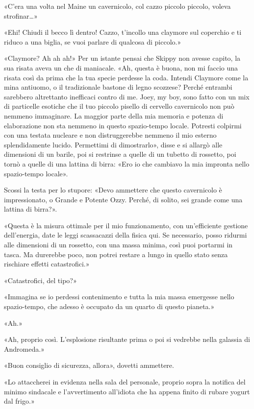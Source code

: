 «C'era una volta nel Maine un cavernicolo, col cazzo piccolo piccolo,
voleva strofinar\ldots»

«Ehi! Chiudi il becco lì dentro! Cazzo, t'incollo una claymore sul
coperchio e ti riduco a una biglia, se vuoi parlare di qualcosa di
piccolo.»

«Claymore? Ah ah ah!» Per un istante pensai che Skippy non avesse
capito, la sua risata aveva un che di maniacale. «Ah, questa è buona,
non mi faccio una risata così da prima che la tua specie perdesse la
coda. Intendi Claymore come la mina antiuomo, o il tradizionale bastone
di legno scozzese? Perché entrambi sarebbero altrettanto inefficaci
contro di me. Joey, my boy, sono fatto con un mix di particelle esotiche
che il tuo piccolo pisello di cervello cavernicolo non può nemmeno
immaginare. La maggior parte della mia memoria e potenza di elaborazione
non sta nemmeno in questo spazio-tempo locale. Potresti colpirmi con una
testata nucleare e non distruggerebbe nemmeno il mio esterno
splendidamente lucido. Permettimi di dimostrarlo», disse e si allargò
alle dimensioni di un barile, poi si restrinse a quelle di un tubetto di
rossetto, poi tornò a quelle di una lattina di birra: «Ero io che
cambiavo la mia impronta nello spazio-tempo locale».

Scossi la testa per lo stupore: «Devo ammettere che questo cavernicolo è
impressionato, o Grande e Potente Ozzy. Perché, di solito, sei grande
come una lattina di birra?».

«Questa è la misura ottimale per il mio funzionamento, con un'efficiente
gestione dell'energia, date le leggi scassacazzi della fisica qui. Se
necessario, posso ridurmi alle dimensioni di un rossetto, con una massa
minima, così puoi portarmi in tasca. Ma durerebbe poco, non potrei
restare a lungo in quello stato senza rischiare effetti catastrofici.»

«Catastrofici, del tipo?»

«Immagina se io perdessi contenimento e tutta la mia massa emergesse
nello spazio-tempo, che adesso è occupato da un quarto di questo
pianeta.»

«Ah.»

«Ah, proprio così. L'esplosione risultante prima o poi si vedrebbe nella
galassia di Andromeda.»

«Buon consiglio di sicurezza, allora», dovetti ammettere.

«Lo attaccherei in evidenza nella sala del personale, proprio sopra la
notifica del minimo sindacale e l'avvertimento all'idiota che ha appena
finito di rubare yogurt dal frigo.»

